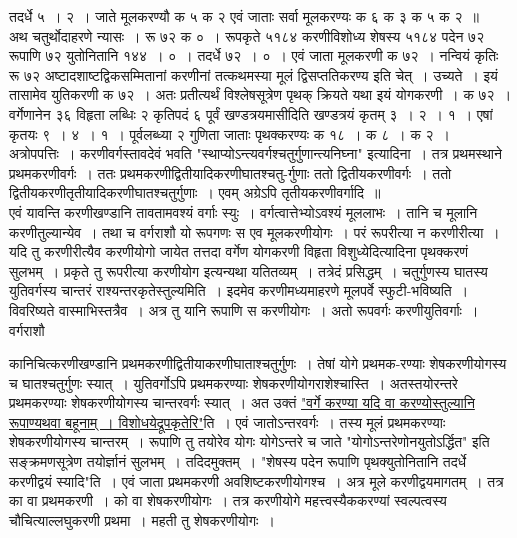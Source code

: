 \documentclass[11pt, openany]{book}
\begin{document}
\noindent तदर्धे ५~। २~। जाते मूलकरण्यौ क ५ क २ एवं जाताः सर्वा 
मूलकरण्यः क ६ क ३ क ५ क २~॥\\

\vspace{-3mm}
 अथ चतुर्थोदाहरणे न्यासः~। रू ७२ क ०~। रूपकृते ५१८४ 
करणीविशोध्य शेषस्य ५१८४ पदेन ७२ रूपाणि ७२ युतोनितानि 
१४४~। ०~। तदर्धे ७२~। ०~। एवं जाता मूलकरणी क ७२~। नन्वियं 
कृतिः रू ७२ अष्टादशाष्टद्विकसम्मितानां करणीनां तत्कथमस्या मूलं 
द्विसप्ततिकरण्य इति चेत्~। उच्यते~। इयं तासामेव युतिकरणी क ७२~। 
अतः प्रतीत्यर्थं विश्लेषसूत्रेण पृथक् क्रियते यथा इयं योगकरणी~। क ७२~। 
वर्गेणानेन ३६ विहृता लब्धिः २ कृतिपदं ६ पूर्वं खण्डत्रयमासीदिति 
खण्डत्रयं कृतम् ३~। २~। १~। एषां कृतयः ९~। ४~। १~। पूर्वलब्ध्या 
२ गुणिता जाताः पृथक्करण्यः क १८~। क ८~। क २~। \\

\vspace{-3mm}
 अत्रोपपत्तिः~। करणीवर्गस्तावदेवं भवति
{\qt "स्थाप्योऽन्त्यवर्गश्चतुर्गुणान्त्यनिघ्ना"} इत्यादिना~। तत्र प्रथमस्थाने प्रथमकरणीवर्गः~। ततः प्रथमकरणीद्वितीयादिकरणीघातश्चतु-र्गुणाः ततो द्वितीयकरणीवर्गः~। ततो द्वितीयकरणीतृतीयादिकरणीघातश्चतुर्गुणाः~। एवम् अग्रेऽपि तृतीयकरणीवर्गादि~॥ \\

\vspace{-3mm}
 एवं यावन्ति करणीखण्डानि तावतामवश्यं वर्गाः स्युः~। वर्गत्वात्तेभ्योऽवश्यं मूललाभः~। तानि च मूलानि करणीतुल्यान्येव~। तथा च 
वर्गराशौ यो रूपगणः स एव मूलकरणीयोगः~। परं रूपरीत्या न करणीरीत्या~। यदि तु करणीरीत्यैव करणीयोगो जायेत तत्तदा वर्गेण योगकरणी 
विहृता विशुध्येदित्यादिना पृथक्करणं सुलभम्~। प्रकृते तु रूपरीत्या 
करणीयोग इत्यन्यथा यतितव्यम्~। तत्रेदं प्रसिद्धम्~। चतुर्गुणस्य घातस्य 
युतिवर्गस्य चान्तरं राश्यन्तरकृतेस्तुल्यमिति~। इदमेव करणीमध्यमाहरणे 
मूलपर्वे स्फुटी-भविष्यति~। विवरिष्यते वास्माभिस्तत्रैव~। अत्र तु यानि 
रूपाणि स करणीयोगः~। अतो रूपवर्गः करणीयुतिवर्गाः~। वर्गराशौ

\newpage%

\noindent कानिचित्करणीखण्डानि प्रथमकरणीद्वितीयाकरणीघाताश्चतुर्गुणः~। तेषां योगे प्रथमक-रण्याः शेषकरणीयोगस्य च घातश्चतुर्गुणः स्यात्~। युतिवर्गोऽपि 
प्रथमकरण्याः शेषकरणीयोगराशेश्चास्ति~। अतस्तयोरन्तरे प्रथमकरण्याः शेषकरणीयोगस्य चान्तरवर्गः स्यात्~। अत उक्तं \hyperref[19]{"वर्गे करण्या यदि वा करण्योस्तुल्यानि रूपाण्यथवा बहूनाम्~। विशोधयेद्रूपकृतेरि"}ति~। एवं
जातोऽन्तरवर्गः~। तस्य मूलं प्रथमकरण्याः शेषकरणीयोगस्य चान्तरम्~। रूपाणि 
तु तयोरेव योगः योगेऽन्तरे च जाते {\qt "योगोऽन्तरेणोनयुतोऽर्द्धित"} इति 
सङ्क्रमणसूत्रेण तयोर्ज्ञानं सुलभम्~। तदिदमुक्तम्~। {\qt "शेषस्य पदेन रूपाणि 
पृथक्युतोनितानि तदर्धे करणीद्वयं स्यादि"}ति~। एवं जाता प्रथमकरणी 
अवशिष्टकरणीयोगश्च~। अत्र मूले करणीद्वयमागतम्~। तत्र का वा 
प्रथमकरणी~। को वा शेषकरणीयोगः~। तत्र करणीयोगे महत्त्वस्यैककरण्यां 
स्वल्पत्वस्य चौचित्याल्लघुकरणी प्रथमा~। महती तु शेषकरणीयोगः~। \\
\end{document}
